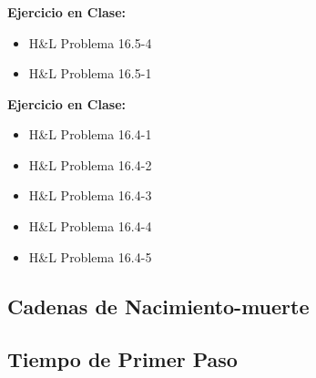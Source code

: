 \documentclass[ 10pt, xcolor = dvipsnames]{beamer}
\begin{document}
\begin{frame}[allowframebreaks]
\frametitle{\insertsubsection}

\textbf{Ejercicio en Clase:}
\begin{itemize}
\item H\&L Problema 16.5-4
\item H\&L Problema 16.5-1
\end{itemize}
\fullskip

\textbf{Ejercicio en Clase:}
\begin{itemize}
\item H\&L Problema 16.4-1
\item H\&L Problema 16.4-2
\item H\&L Problema 16.4-3
\item H\&L Problema 16.4-4
\item H\&L Problema 16.4-5
\end{itemize}

\end{frame}

\subsection{Cadenas de Nacimiento-muerte}

%
%
%

\subsection{Tiempo de Primer Paso}
\end{document}
